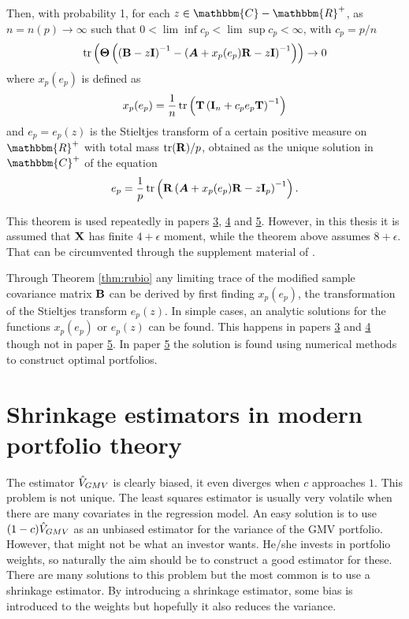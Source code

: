 \documentclass[12pt, oneside]{book}\usepackage{knitr}
\begin{document}
{\begin{theorem}
Then, with probability 1, for each $z\in \mathbbm{C}-\mathbbm{R}^+$, as $n=n(p) \rightarrow \infty$ such that $0<\lim\inf c_p<\lim \sup c_p < \infty$, with $c_p = p/n$
\begin{equation}
  \operatorname{tr}\left(\mathbf{\Theta}\left( \left(\mathbf{B} - z\mathbf{I}\right)^{-1} - \left( \mbox{\boldmath$A$} + x_p(e_p)\mathbf{R} - z\mathbf{I} \right)^{-1} \right) \right) \rightarrow 0
\end{equation}
where $x_p(e_p)$ is defined as
\begin{equation}
  x_p(e_p) = \frac{1}{n}\operatorname{tr} \left( \mathbf{T} \left(\mathbf{I}_n + c_p e_p \mathbf{T} \right)^{-1} \right)
\end{equation}
and $e_p=e_p(z)$ is the Stieltjes transform of a certain positive measure on $\mathbbm{R}^+$ with total mass $\operatorname{tr}(\mathbf{R})/p$, obtained as the unique solution in $\mathbbm{C}^+$ of the equation
\begin{equation}
  e_p = \frac{1}{p}\operatorname{tr} \left( \mathbf{R} \left(\mbox{\boldmath$A$} +  x_p(e_p) \mathbf{R} - z\mathbf{I}_p \right)^{-1} \right).
\end{equation}
\end{theorem}
This theorem is used repeatedly in papers \hyperref[sec:paper3]{3}, \hyperref[sec:paper4]{4} and \hyperref[sec:paper5]{5}.
However, in this thesis it is assumed that $\mathbf{X}$ has finite $4+\epsilon$ moment, while the theorem above assumes $8+\epsilon$. 
That can be circumvented through the supplement material of \citet{BodnarGuptaParolya2016}.

Through Theorem \ref{thm:rubio} any limiting trace of the modified sample covariance matrix $\mathbf{B}$ can be derived by first finding $x_p(e_p)$, the transformation of the Stieltjes transform $e_p(z)$.
In simple cases, an analytic solutions for the functions $x_p(e_p)$ or $e_p(z)$ can be found. 
This happens in papers \hyperref[sec:paper3]{3} and \hyperref[sec:paper4]{4} though not in paper \hyperref[sec:paper5]{5}. 
In paper \hyperref[sec:paper5]{5} the solution is found using numerical methods to construct optimal portfolios.

\section{Shrinkage estimators in modern portfolio theory}
The estimator $\hat{V}_{GMV}$ is clearly biased, it even diverges when $c$ approaches $1$.
This problem is not unique.
The least squares estimator is usually very volatile when there are many covariates in the regression model. 
An easy solution is to use $(1-c)\hat{V}_{GMV}$ as an unbiased estimator for the variance of the GMV portfolio.
However, that might not be what an investor wants.
He/she invests in portfolio weights, so naturally the aim should be to construct a good estimator for these.
There are many solutions to this problem but the most common is to use a shrinkage estimator.
By introducing a shrinkage estimator, some bias is introduced to the weights but hopefully it also reduces the variance.

}
\end{document}
